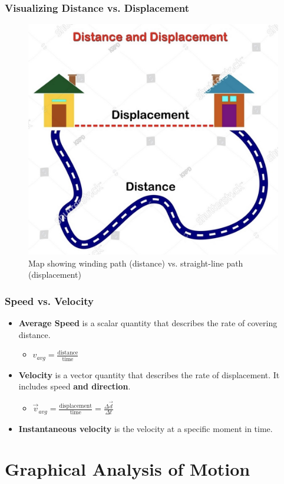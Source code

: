 \documentclass{beamer}
\begin{document}
\begin{frame}
\frametitle{Visualizing Distance vs. Displacement}
\begin{figure}
    \centering
    \includegraphics[width=0.5\linewidth]{phys11-distance-displacement-diagram.png}
    \caption{Map showing winding path (distance) vs. straight-line path (displacement)}
\end{figure}
\end{frame}

\begin{frame}
\frametitle{Speed vs. Velocity}
\begin{itemize}
    \item \textbf{Average Speed} is a \alert{scalar} quantity that describes the rate of covering distance.
    \begin{itemize}
        \item $v_{avg} = \frac{\text{distance}}{\text{time}}$
    \end{itemize}
    \item \textbf{Velocity} is a \alert{vector} quantity that describes the rate of displacement. It includes speed \textbf{and direction}.
    \begin{itemize}
        \item $\vec{v}_{avg} = \frac{\text{displacement}}{\text{time}} = \frac{\Delta\vec{d}}{\Delta t}$
    \end{itemize}
    \item \textbf{Instantaneous velocity} is the velocity at a specific moment in time.
\end{itemize}
\end{frame}

\section{Graphical Analysis of Motion}
\end{document}
